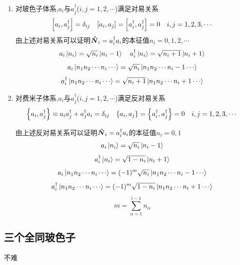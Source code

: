 \documentclass{article}
\begin{document}
\begin{formal}
\begin{enumerate}
            \item 对玻色子体系,$a_{i}$与$a_{j}^{\dagger}$($i,j=1,2,\cdots$)满足对易关系
                  $$ 
                  \comm{a_{i}}{a_{j}^{\dagger}} = \delta_{ij} \quad 
                  \comm{a_{i}}{a_{j}} = \comm{a_{i}^{\dagger}}{a_{j}^{\dagger}} = 0 \quad i,j=1,2,3,\cdots
                  $$
                  由上述对易关系可以证明$\vu*{N}_{i} = a_{i}^{\dagger} a_{i} $的本征值$n_{i} = 0,1,2,\cdots$
                  $$ a_{i} \ket{n_{i}} = \sqrt{n_{i}} \ket{n_{i} - 1} \quad a_{i}^{\dagger} \ket{n_{i}} = \sqrt{n_{i}+1} \ket{n_{i} + 1} $$
                  $$ a_{i} \ket{n_{1}n_{2}\cdots n_{i}\cdots}  = \sqrt{n_{i}} \ket{n_{1}n_{2}\cdots n_{i}-1 \cdots} $$
                  $$ a_{i}^{\dagger} \ket{n_{1}n_{2}\cdots n_{i}\cdots}  = \sqrt{n_{i}+1} \ket{n_{1}n_{2}\cdots n_{i}+1 \cdots} $$

            \item 对费米子体系,$a_{i}$与$a_{j}^{\dagger}$($i,j=1,2,\cdots$)满足反对易关系
                  $$ 
                  \qty{ a_{i},a_{j}^{\dagger}} \equiv a_{i} a_{j}^{\dagger} + a_{j}^{\dagger} a_{i} = \delta_{ij} \quad 
                  \qty{a_{i},a_{j}} =  \qty{a_{i}^{\dagger},a_{j}^{\dagger}} = 0 \quad 
                  i,j=1,2,3,\cdots
                  $$

                  由上述反对易关系可以证明$\vu*{N}_{i} = a_{i}^{\dagger} a_{i} $的本征值$n_{i} = 0,1$
                  $$
                  a_{i} \ket{n_{i}} = \sqrt{n_{i}} \ket{n_{i} - 1}
                  $$
                  $$
                  a_{i}^{\dagger} \ket{n_{i}} = \sqrt{1-n_{i}} \ket{n_{i} + 1}
                  $$
                  $$
                  a_{i} \ket{n_{1}n_{2}\cdots n_{i}\cdots}  = (-1)^{m} \sqrt{n_{i}} \ket{n_{1}n_{2}\cdots n_{i} - 1 \cdots} 
                  $$
                  $$
                  a_{i}^{\dagger} \ket{n_{1}n_{2}\cdots n_{i}\cdots}  = (-1)^{m} \sqrt{1 - n_{i}} \ket{n_{1}n_{2}\cdots n_{i} + 1 \cdots} 
                  $$
                  $$
                  m = \sum\limits_{\alpha=1}^{i-1} n_{\alpha}
                  $$
        \end{enumerate}
        \end{formal}

        \subsection{三个全同玻色子}
            不难
\end{document}
